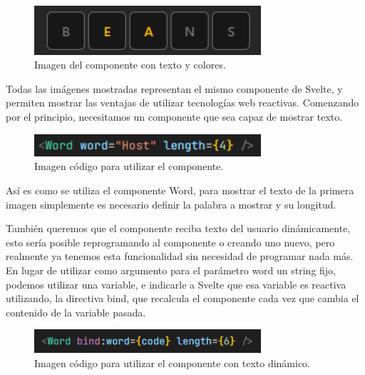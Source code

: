 \begin{figure}[H]
	\centering
	\includegraphics[clip=true, width=0.75\textwidth]{images/reusing/colored_component.png}
	\caption{Imagen del componente con texto y colores.}
	\label{fig:comp_colored}
\end{figure}

Todas las imágenes mostradas representan el mismo componente de Svelte, y permiten mostrar las ventajas de utilizar tecnologías web reactivas.
Comenzando por el principio, necesitamos un componente que sea capaz de mostrar texto.

\begin{figure}[H]
	\centering
	\includegraphics[clip=true, width=0.75\textwidth]{images/reusing/code_simple_component.png}
	\caption{Imagen código para utilizar el componente.}
	\label{fig:comp_simple_code}
\end{figure}

Así es como se utiliza el componente Word, para mostrar el texto de la primera imagen simplemente es necesario definir la palabra a mostrar y su longitud.

También queremos que el componente reciba texto del usuario dinámicamente, esto sería posible reprogramando al componente o creando uno nuevo, pero realmente ya tenemos esta funcionalidad sin necesidad de programar nada más. En lugar de utilizar como argumento para el parámetro word un string fijo, podemos utilizar una variable, e indicarle a Svelte que esa variable es reactiva utilizando, la directiva bind, que recalcula el componente cada vez que cambia el contenido de la variable pasada.

\begin{figure}[H]
	\centering
	\includegraphics[clip=true, width=0.75\textwidth]{images/reusing/code_dyn_component.png}
	\caption{Imagen código para utilizar el componente con texto dinámico.}
	\label{fig:comp_dyn_code}
\end{figure}

